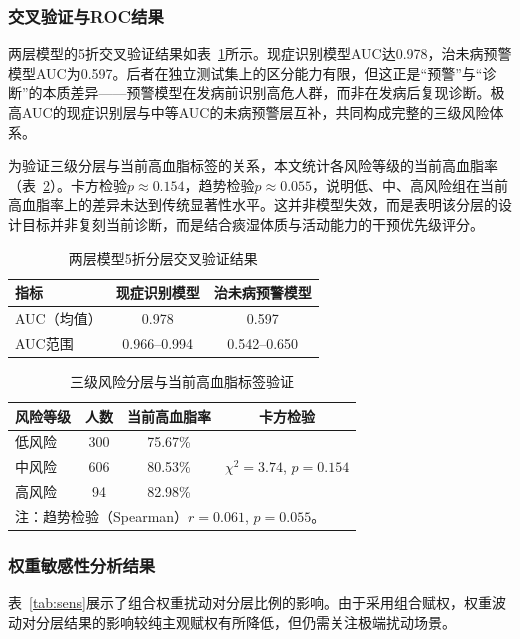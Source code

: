 \documentclass[a4paper,12pt]{ctexart}
\begin{document}
\subsubsection{交叉验证与ROC结果}
两层模型的5折交叉验证结果如表~\ref{tab:cv}所示。现症识别模型AUC达0.978，治未病预警模型AUC为0.597。后者在独立测试集上的区分能力有限，但这正是``预警''与``诊断''的本质差异——预警模型在发病前识别高危人群，而非在发病后复现诊断。极高AUC的现症识别层与中等AUC的未病预警层互补，共同构成完整的三级风险体系。

为验证三级分层与当前高血脂标签的关系，本文统计各风险等级的当前高血脂率（表~\ref{tab:validation}）。卡方检验$p\approx0.154$，趋势检验$p\approx0.055$，说明低、中、高风险组在当前高血脂率上的差异未达到传统显著性水平。这并非模型失效，而是表明该分层的设计目标并非复刻当前诊断，而是结合痰湿体质与活动能力的干预优先级评分。

\begin{table}[H]
\centering
\caption{两层模型5折分层交叉验证结果}
\label{tab:cv}
\begin{tabular}{lcc}
\toprule
\textbf{指标} & \textbf{现症识别模型} & \textbf{治未病预警模型} \\
\midrule
AUC（均值） & 0.978 & 0.597 \\
AUC范围 & 0.966--0.994 & 0.542--0.650 \\
\bottomrule
\end{tabular}
\end{table}

\begin{table}[H]
\centering
\caption{三级风险分层与当前高血脂标签验证}
\label{tab:validation}
\begin{tabular}{lccc}
\toprule
\textbf{风险等级} & \textbf{人数} & \textbf{当前高血脂率} & \textbf{卡方检验} \\
\midrule
低风险  & 300 & 75.67\% & \multirow{3}{*}{$\chi^2=3.74$, $p=0.154$} \\
中风险  & 606 & 80.53\% &  \\
高风险  &  94 & 82.98\% &  \\
\bottomrule
\multicolumn{4}{l}{\small 注：趋势检验（Spearman）$r=0.061$, $p=0.055$。}
\end{tabular}
\end{table}

\subsubsection{权重敏感性分析结果}
表~\ref{tab:sens}展示了组合权重扰动对分层比例的影响。由于采用组合赋权，权重波动对分层结果的影响较纯主观赋权有所降低，但仍需关注极端扰动场景。
\end{document}
